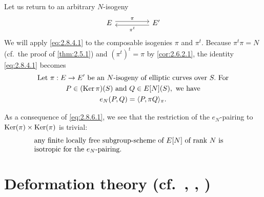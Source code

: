 \kmitem\label{item:2.8.6}
Let us return to an arbitrary $N$-isogeny
\[
\begin{tikzcd}[column sep=huge]
  E \arrow[r, shift left=0.6ex, "\pi"] & E' \arrow[l, shift left=0.6ex, "\pi^t"]
\end{tikzcd}
\]
We will apply \eqref{eq:2.8.4.1} to the composable isogenies $\pi$ and $\pi^t$. Because $\pi^t \pi = N$ (cf.\ the proof of \ref{thm:2.5.1}) and $(\pi^t)^t = \pi$ by \ref{cor:2.6.2.1}, the identity \eqref{eq:2.8.4.1} becomes
\begin{equation}\label{eq:2.8.6.1}
\begin{gathered}
\text{Let } \pi : E \to E' \text{ be an } N\text{-isogeny of elliptic curves over } S. \text{ For} \\
P \in (\operatorname{Ker} \pi)(S) \text{ and } Q \in E[N](S), \text{ we have} \\
e_N(P, Q) = \langle P, \pi Q \rangle_\pi.
\end{gathered}
\end{equation}

\kmitem\label{item:2.8.7}
As a consequence of \eqref{eq:2.8.6.1}, we see that the restriction of the $e_N$-pairing to $\operatorname{Ker}(\pi) \times \operatorname{Ker}(\pi)$ is trivial:
\begin{equation}\label{eq:2.8.7.1}
\parbox[t]{0.80\linewidth}{\raggedright any finite locally free subgroup-scheme of $E[N]$ of rank $N$ is isotropic for the $e_N$-pairing.}
\end{equation}

\section{Deformation theory (cf.~\cite{SeTa1}, \cite{Dr2}, \cite{K5})}
\label{sec:2.9}

